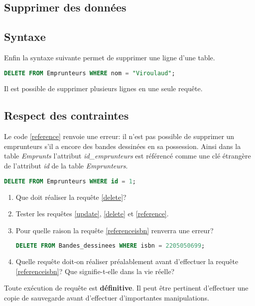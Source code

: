 \documentclass[a4paper,11pt]{article}
\begin{document}
\begin{Form}
\section{Supprimer des données}
\subsection{Syntaxe}
Enfin la syntaxe suivante permet de supprimer une ligne d'une table.
\begin{center}
\begin{lstlisting}[language=SQL]
DELETE FROM Emprunteurs WHERE nom = "Viroulaud";
\end{lstlisting}
\label{delete}
\end{center}
Il est possible de supprimer plusieurs lignes en une seule requête.
\subsection{Respect des contraintes}
Le code \ref{reference} renvoie une erreur: il n'est pas possible de supprimer un emprunteurs s'il a encore des bandes dessinées en sa possession. Ainsi dans la table \emph{Emprunts} l'attribut \emph{id\_emprunteurs} est référencé comme une clé étrangère de l'attribut \emph{id} de la table \emph{Emprunteurs}.
\begin{center}
\begin{lstlisting}[language=SQL]
DELETE FROM Emprunteurs WHERE id = 1;
\end{lstlisting}
\label{reference}
\end{center}
\begin{activite}
\begin{enumerate}
\item Que doit réaliser la requête \ref{delete}?
\item Tester les requêtes \ref{update}, \ref{delete} et \ref{reference}.
\item Pour quelle raison la requête \ref{referenceisbn} renverra une erreur?
\begin{center}
\begin{lstlisting}[language=SQL]
DELETE FROM Bandes_dessinees WHERE isbn = 2205050699;
\end{lstlisting}
\label{referenceisbn}
\end{center}
\item Quelle requête doit-on réaliser préalablement avant d'effectuer la requête \ref{referenceisbn}? Que signifie-t-elle dans la vie réelle?
\end{enumerate}
\end{activite}
\begin{aretenir}[]
Toute exécution de requête est \textbf{définitive}. Il peut être pertinent d'effectuer une copie de sauvegarde avant d'effectuer d'importantes manipulations.
\end{aretenir}
\end{Form}
\end{document}
